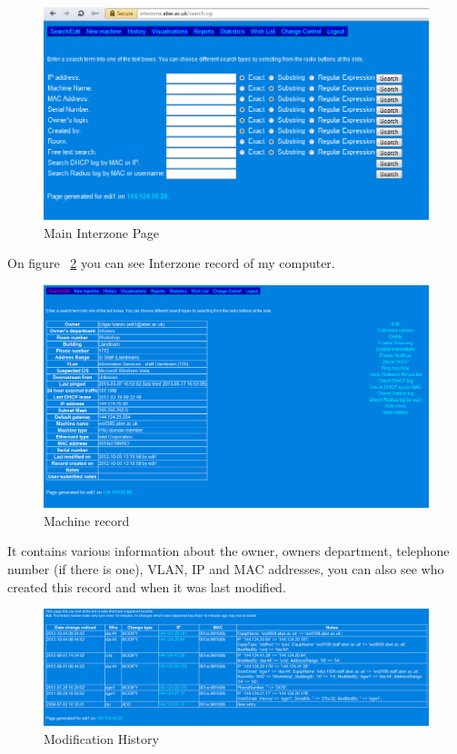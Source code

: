 \documentclass[10pt,a4paper,headinclude=true]{report}
\begin{document}
\begin{figure}[H]
\centering
\centerline{\includegraphics[scale=0.5]{./main_interzone_page}}
\caption{Main Interzone Page}
\label{fig:main_interzone_page}
\end{figure}

On figure ~\ref{fig:machine_record} you can see Interzone record of my computer.

\begin{figure}[H]
\centering
\centerline{\includegraphics[scale=0.5]{./machine_record}}
\caption{Machine record}
\label{fig:machine_record}
\end{figure}

It contains various information about the owner, owners department, telephone number (if there is one), VLAN, IP and MAC addresses, you can also see who created this record and when it was last modified.

\begin{figure}[H]
\centering
\centerline{\includegraphics[scale=0.5]{./modification_history}}
\caption{Modification History}
\label{fig:modification_history}
\end{figure}
\end{document}
